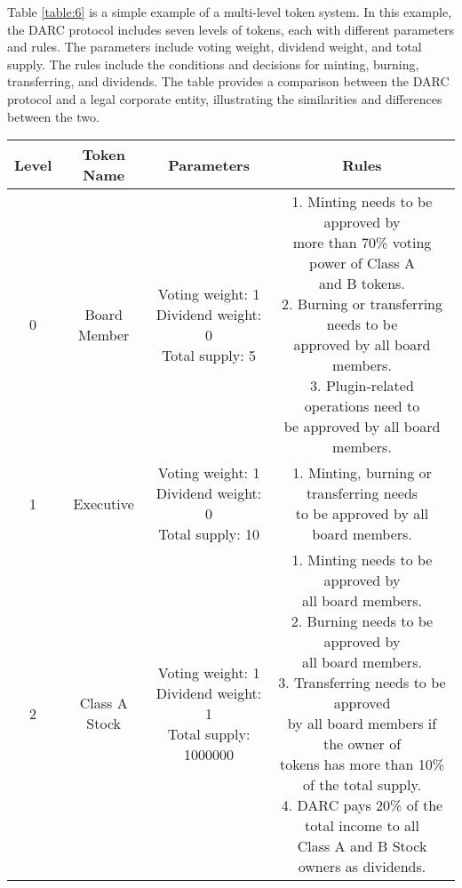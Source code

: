 \documentclass[main.tex]{subfiles}
\begin{document}
Table \ref{table:6} is a simple example of a multi-level token system. In this example, the DARC protocol includes seven levels of tokens, each with different parameters and rules. The parameters include voting weight, dividend weight, and total supply. The rules include the conditions and decisions for minting, burning, transferring, and dividends. The table provides a comparison between the DARC protocol and a legal corporate entity, illustrating the similarities and differences between the two.

\begin{table}[h!]
    \centering
    \begin{tabular}{| c | c | c| c |} 
        \hline
        Level & Token Name & Parameters & Rules \\ [0.5ex] 
        \hline\hline
    0 & Board Member & \makecell[l]{Voting weight: 1 \\ Dividend weight: 0 \\ Total supply: 5} & \makecell[l]{1. Minting needs to be approved by \\  more than 70\% voting power of Class A \\ and B tokens. \\ 2. Burning or transferring needs to be \\ approved by all board members. \\ 3. Plugin-related operations need to \\ be approved by all board members.} \\
    \hline 
    1 & Executive  & \makecell[l]{Voting weight: 1 \\ Dividend weight: 0 \\ Total supply: 10} & \makecell[l]{1. Minting, burning or transferring needs \\ to be  approved by all board members. } \\
    \hline
    2 & Class A Stock & \makecell[l]{Voting weight: 1 \\ Dividend weight: 1 \\ Total supply: 1000000} & \makecell[l]{1. Minting needs to be approved by \\ all board members. \\ 2. Burning needs to be approved by \\ all board members. \\ 3. Transferring needs to be approved \\ by all board members if the owner of \\ tokens has more than 10\% of the total supply. \\ 4. DARC pays 20\% of the total income to all \\ Class A and B Stock owners as dividends.} \\

\end{tabular}
\end{table}
\end{document}
